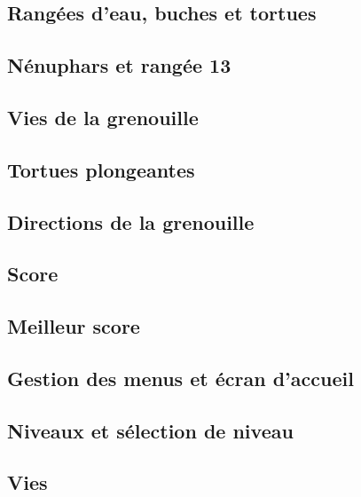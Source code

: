 \documentclass[a4paper, 12pt]{article}
\begin{document}
\subsection{Rangées d'eau, buches et tortues}

\subsection{Nénuphars et rangée 13}

\subsection{Vies de la grenouille}

\subsection{Tortues plongeantes}

\subsection{Directions de la grenouille}

\subsection{Score}

\subsection{Meilleur score}

\subsection{Gestion des menus et écran d'accueil}

\subsection{Niveaux et sélection de niveau}

\subsection{Vies}
\end{document}
